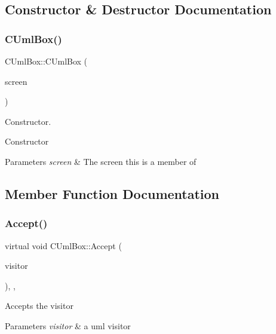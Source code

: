 \subsection{Constructor \& Destructor Documentation}
\mbox{\label{class_c_uml_box_a33ef82a7e08fb8882c771d5117cd698f}} 
\subsubsection{\texorpdfstring{CUmlBox()}{CUmlBox()}}
{\footnotesize\ttfamily C\+Uml\+Box\+::\+C\+Uml\+Box (\begin{DoxyParamCaption}\item[{\mbox{\hyperlink{class_c_screen}{C\+Screen}} $\ast$}]{screen }\end{DoxyParamCaption})}



Constructor. 

Constructor 
\begin{DoxyParams}{Parameters}
{\em screen} & The screen this is a member of \\
\hline
\end{DoxyParams}


\subsection{Member Function Documentation}
\mbox{\label{class_c_uml_box_a492e1d6063c938e7f099fe5640fc669b}} 
\subsubsection{\texorpdfstring{Accept()}{Accept()}}
{\footnotesize\ttfamily virtual void C\+Uml\+Box\+::\+Accept (\begin{DoxyParamCaption}\item[{\mbox{\hyperlink{class_c_visitor}{C\+Visitor}} $\ast$}]{visitor }\end{DoxyParamCaption})\hspace{0.3cm}{\ttfamily [inline]}, {\ttfamily [override]}, {\ttfamily [virtual]}}

Accepts the visitor 
\begin{DoxyParams}{Parameters}
{\em visitor} & a uml visitor \\
\hline
\end{DoxyParams}


